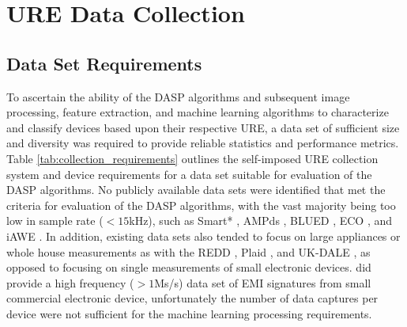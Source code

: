 
\chapter{URE Data Collection}
\label{URE Data Collection Chapter}

\section[Data Requirements]{Data Set Requirements}

To ascertain the ability of the DASP algorithms and subsequent image processing, feature extraction, and machine learning algorithms to characterize and classify devices based upon their respective URE, a data set of sufficient size and diversity was required to provide reliable statistics and performance metrics.  Table \ref{tab:collection_requirements} outlines the self-imposed URE collection system and device requirements for a data set suitable for evaluation of the DASP algorithms.  No publicly available data sets were identified that met the criteria for evaluation of the DASP algorithms, with the vast majority being too low in sample rate ($< 15$kHz), such as Smart* \cite{Barker2012}, AMPds \cite{Makonin2013}, BLUED \cite{Filip2011}, ECO \cite{Beckel2014}, and iAWE \cite{Batra2014}.  In addition, existing data sets also tended to focus on large appliances or whole house measurements as with the REDD \cite{Kolter2011},  Plaid \cite{Gao2014}, and UK-DALE \cite{Kelly2015}, as opposed to focusing on single measurements of small electronic devices.  \cite{Gulati2014} did provide a high frequency ($>1$Ms/s) data set of EMI signatures from small commercial electronic device, unfortunately the number of data captures per device were not sufficient for the machine learning processing requirements. 

